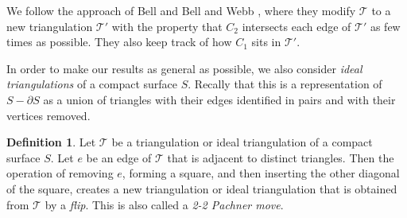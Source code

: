 \documentclass[oneside]{amsart}
\numberwithin{equation}{section}
\theoremstyle{plain}
\newtheorem{theorem}[equation]{Theorem}
\theoremstyle{definition}
\newtheorem{definition}[equation]{Definition}
\newcommand{\calT}{{\mathcal{T}}}
\begin{document}



We follow the approach of Bell \cite{Bell} and Bell and Webb \cite{BellWebb}, where they modify $\calT$ to a new triangulation $\calT'$ with the property that $C_2$ intersects each edge of $\calT'$ as few times as possible. They also keep track of how $C_1$ sits in $\calT'$. 

In order to make our results as general as possible, we also consider \emph{ideal triangulations} of a compact surface $S$. Recally that this is a representation of $S - \partial S$ as a union of triangles with their edges identified in pairs and with their vertices removed.

\begin{definition}
\label{Def:Flip}
Let $\calT$ be a triangulation or ideal triangulation of a compact surface $S$. Let $e$ be an edge of $\calT$ that is adjacent to distinct triangles. Then the operation of removing $e$, forming a square, and then inserting the other diagonal of the square, creates a new triangulation or ideal triangulation that is obtained from $\calT$ by a \emph{flip}. This is also called a \emph{2-2 Pachner move}.
\end{definition}
\end{document}
